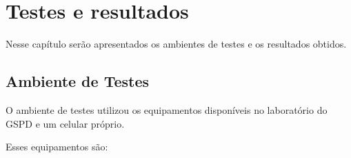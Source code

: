 
\chapter{Testes e resultados}
\label{cap4}

Nesse capítulo serão apresentados os ambientes de testes e os resultados obtidos.

\section{Ambiente de Testes}

    O ambiente de testes utilizou os equipamentos disponíveis no laboratório do GSPD e um celular próprio.
    
    Esses equipamentos são:
    

